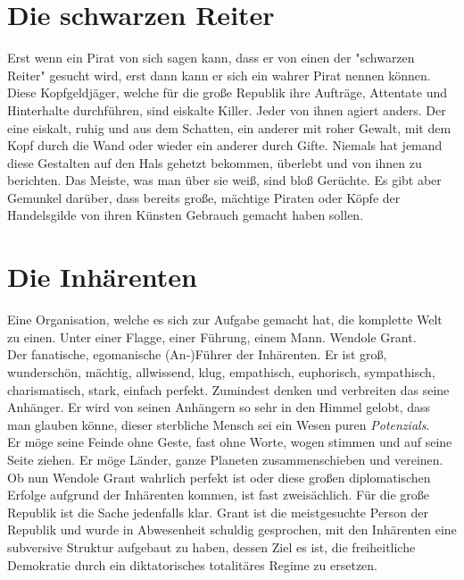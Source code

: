 \documentclass{book}
\begin{document}
\section{Die schwarzen Reiter}
Erst wenn ein Pirat von sich sagen kann, dass er von einen der "schwarzen Reiter" gesucht wird, erst dann kann er sich ein wahrer Pirat nennen können.
Diese Kopfgeldjäger, welche für die große Republik ihre Aufträge, Attentate und Hinterhalte durchführen, sind eiskalte Killer. Jeder von ihnen agiert anders. Der eine eiskalt, ruhig und aus dem Schatten, ein anderer mit roher Gewalt, mit dem Kopf durch die Wand oder wieder ein anderer durch Gifte.
Niemals hat jemand diese Gestalten auf den Hals gehetzt bekommen, überlebt und von ihnen zu berichten. Das Meiste, was man über sie weiß, sind bloß Gerüchte. Es gibt aber Gemunkel darüber, dass bereits große, mächtige Piraten oder Köpfe der Handelsgilde von ihren Künsten Gebrauch gemacht haben sollen.

\section{Die Inhärenten}
Eine Organisation, welche es sich zur Aufgabe gemacht hat, die komplette Welt zu einen. Unter einer Flagge, einer Führung, einem Mann. Wendole Grant.\\
Der fanatische, egomanische (An-)Führer der Inhärenten. Er ist groß, wunderschön, mächtig, allwissend, klug, empathisch, euphorisch, sympathisch, charismatisch, stark, einfach perfekt. Zumindest denken und verbreiten das seine Anhänger. Er wird von seinen Anhängern so sehr in den Himmel gelobt, dass man glauben könne, dieser sterbliche Mensch sei ein Wesen puren \emph{Potenzials}.\\
Er möge seine Feinde ohne Geste, fast ohne Worte, wogen stimmen und auf seine Seite ziehen. Er möge Länder, ganze Planeten zusammenschieben und vereinen. Ob nun Wendole Grant wahrlich perfekt ist oder diese großen diplomatischen Erfolge aufgrund der Inhärenten kommen, ist fast zweisächlich. Für die große Republik ist die Sache jedenfalls klar. Grant ist die meistgesuchte Person der Republik und wurde in Abwesenheit schuldig gesprochen, mit den Inhärenten eine subversive Struktur aufgebaut zu haben, dessen Ziel es ist, die freiheitliche Demokratie durch ein diktatorisches totalitäres Regime zu ersetzen.
\end{document}
